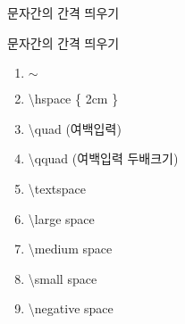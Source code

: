 \documentclass[ aspectratio=149,  14pt,blue,xcolor=pdftex,dvipsnames,table,handout,notes]{beamer}
\begin{document}
		\begin{frame}[t,allowframebreaks]{문자간의 간격 띄우기}

			\begin{block} {문자간의 간격 띄우기}
			\begin{enumerate}

			\item $\sim$\\
			\item \textbackslash hspace \{ 2cm \} \\
			\item \textbackslash quad 	(여백입력)\\
			\item \textbackslash qquad 	(여백입력 두배크기)\\
			\item \textbackslash textspace \\
			\item \textbackslash large space \\
			\item \textbackslash medium space \\
			\item \textbackslash small space \\
			\item \textbackslash negative space \\
			\end{enumerate}

			\end{block}

		
		\end{frame}
\end{document}

